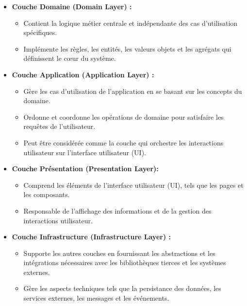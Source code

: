 \begin{itemize}
    \item \textbf{Couche Domaine (Domain Layer) :}
        \begin{itemize}
            \item Contient la logique métier centrale et indépendante des cas d'utilisation spécifiques.
            \item Implémente les règles, les entités, les valeurs objets et les agrégats qui définissent le cœur du système.
        \end{itemize}




    \item \textbf{Couche Application (Application Layer) :}
        \begin{itemize}
            \item Gère les cas d'utilisation de l'application en se basant sur les concepts du domaine.
            \item Ordonne et coordonne les opérations de domaine pour satisfaire les requêtes de l'utilisateur.
            \item Peut être considérée comme la couche qui orchestre les interactions utilisateur sur l'interface utilisateur (UI).
        \end{itemize}







    \item \textbf{Couche Présentation (Presentation Layer):}
        \begin{itemize}
            \item Comprend les éléments de l'interface utilisateur (UI), tels que les pages et les composants.
            \item Responsable de l'affichage des informations et de la gestion des interactions utilisateur.
        \end{itemize}






    \item \textbf{Couche Infrastructure (Infrastructure Layer) :}
        \begin{itemize}
            \item Supporte les autres couches en fournissant les abstractions et les intégrations nécessaires avec les bibliothèques tierces et les systèmes externes.
            \item Gère les aspects techniques tels que la persistance des données, les services externes, les messages et les événements.
        \end{itemize}
    
\end{itemize}



